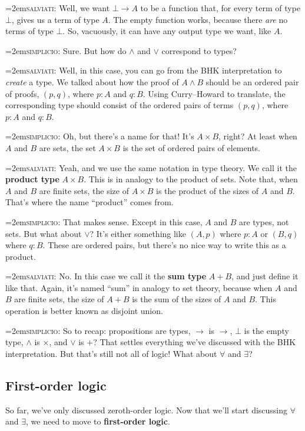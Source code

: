 \documentclass[11pt,paper=letter]{scrartcl}
\renewcommand{\land}{\wedge}
\renewcommand{\lor}{\vee}
\newcommand{\false}{\bot}
\newcommand{\simp}{\vspace{0.5em}\noindent\hangindent=2em\textsc{simplicio:} }
\newcommand{\salv}{\vspace{0.5em}\noindent\hangindent=2em\textsc{salviati:} }
\begin{document}
\salv Well, we want $\false \to A$ to be a function that, for every term of type $\false$, gives us a term of type $A$. The empty function works, because there \emph{are} no terms of type $\false$. So, vacuously, it can have any output type we want, like $A$.

\simp Sure. But how do $\land$ and $\lor$ correspond to types?

\salv Well, in this case, you can go from the BHK interpretation to \emph{create} a type. We talked about how the proof of $A \land B$ should be an ordered pair of proofs, $(p, q)$, where $p : A$ and $q : B$. Using Curry--Howard to translate, the corresponding type should consist of the ordered pairs of terms $(p, q)$, where $p : A$ and $q : B$.

\simp Oh, but there's a name for that! It's $A \times B$, right? At least when $A$ and $B$ are sets, the set $A \times B$ is the set of ordered pairs of elements.

\salv Yeah, and we use the same notation in type theory. We call it the \textbf{product type} $A \times B$. This is in analogy to the product of sets. Note that, when $A$ and $B$ are finite sets, the size of $A \times B$ is the product of the sizes of $A$ and $B$. That's where the name ``product'' comes from.

\simp That makes sense. Except in this case, $A$ and $B$ are types, not sets. But what about $\lor$? It's either something like $(A, p)$ where $p : A$ or $(B, q)$ where $q : B$. These are ordered pairs, but there's no nice way to write this as a product.

\salv No. In this case we call it the \textbf{sum type} $A + B$, and just define it like that. Again, it's named ``sum'' in analogy to set theory, because when $A$ and $B$ are finite sets, the size of $A + B$ is the sum of the sizes of $A$ and $B$. This operation is better known as disjoint union.

\simp So to recap: propositions are types, $\to$ is $\to$, $\false$ is the empty type, $\land$ is $\times$, and $\lor$ is $+$? That settles everything we've discussed with the BHK interpretation. But that's still not all of logic! What about $\forall$ and $\exists$?

\subsection{First-order logic}

So far, we've only discussed zeroth-order logic. Now that we'll start discussing $\forall$ and $\exists$, we need to move to \textbf{first-order logic}.
\end{document}
